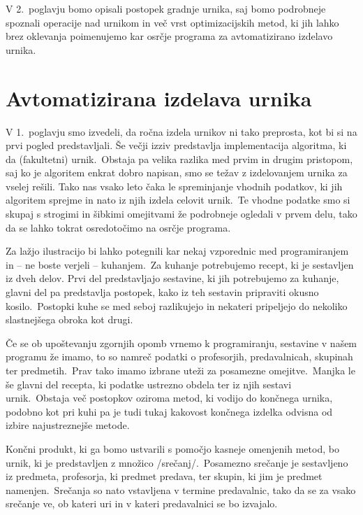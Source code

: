 \documentclass[a4paper,10pt]{article}
\begin{document}
V 2.\ poglavju bomo opisali postopek gradnje urnika, saj bomo podrobneje spoznali
operacije nad urnikom in več vrst optimizacijskih metod, ki jih lahko brez oklevanja
poimenujemo kar osrčje programa za avtomatizirano izdelavo urnika.

\section{Avtomatizirana izdelava urnika} %

V 1.\ poglavju smo izvedeli, da ročna izdela urnikov ni tako preprosta, kot bi si
na prvi pogled predstavljali. Še večji izziv predstavlja implementacija algoritma, ki da
(fakultetni) urnik.\ Obstaja pa velika razlika med prvim in drugim pristopom, saj ko je
algoritem enkrat dobro napisan, smo se težav z izdelovanjem urnika za vselej rešili.
Tako nas vsako leto čaka le spreminjanje vhodnih podatkov, ki jih algoritem sprejme in
nato iz njih izdela celovit urnik.\ Te vhodne podatke smo si skupaj s strogimi in šibkimi
omejitvami že podrobneje ogledali v prvem delu, tako da se lahko tokrat osredotočimo na
osrčje programa.

Za lažjo ilustracijo bi lahko potegnili kar nekaj vzporednic med programiranjem in -- ne
boste verjeli -- kuhanjem.\ Za kuhanje potrebujemo recept, ki je sestavljen iz dveh delov.
Prvi del predstavljajo sestavine, ki jih potrebujemo za kuhanje, glavni del pa predstavlja
postopek, kako iz teh sestavin pripraviti okusno kosilo.\ Postopki kuhe se med seboj
razlikujejo in nekateri pripeljejo do nekoliko slastnejšega obroka kot drugi.

Če se ob upoštevanju zgornjih opomb vrnemo k programiranju, sestavine v našem programu že
imamo, to so namreč podatki o profesorjih, predavalnicah, skupinah ter predmetih.\ Prav tako
imamo izbrane uteži za posamezne omejitve.\ Manjka le še glavni del recepta, ki podatke
ustrezno obdela ter iz njih sestavi urnik.\ Obstaja več postopkov oziroma metod, ki vodijo
do končnega urnika, podobno kot pri kuhi pa je tudi tukaj kakovost končnega izdelka odvisna
od izbire najustreznejše metode.

Končni produkt, ki ga bomo ustvarili s pomočjo kasneje omenjenih metod, bo urnik, ki je
predstavljen z množico /srečanj/.\ Posamezno srečanje je sestavljeno iz predmeta,
profesorja, ki predmet predava, ter skupin, ki jim je predmet namenjen.\ Srečanja so nato
vstavljena v termine predavalnic, tako da se za vsako srečanje ve, ob kateri uri in v
kateri predavalnici se bo izvajalo.
\end{document}
